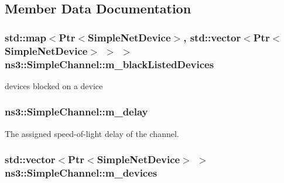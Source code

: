 \subsection{Member Data Documentation}
\subsubsection[{\texorpdfstring{m\+\_\+black\+Listed\+Devices}{m_blackListedDevices}}]{\setlength{\rightskip}{0pt plus 5cm}std\+::map$<${\bf Ptr}$<${\bf Simple\+Net\+Device}$>$, std\+::vector$<${\bf Ptr}$<${\bf Simple\+Net\+Device}$>$ $>$ $>$ ns3\+::\+Simple\+Channel\+::m\+\_\+black\+Listed\+Devices\hspace{0.3cm}{\ttfamily [private]}}\hypertarget{classns3_1_1SimpleChannel_aa50da357cc589209b13f7233d3b80898}{}\label{classns3_1_1SimpleChannel_aa50da357cc589209b13f7233d3b80898}


devices blocked on a device 

\subsubsection[{\texorpdfstring{m\+\_\+delay}{m_delay}}]{ ns3\+::\+Simple\+Channel\+::m\+\_\+delay\hspace{0.3cm}{\ttfamily [private]}}\hypertarget{classns3_1_1SimpleChannel_ada64a5f43714383448147d577bd8d619}{}\label{classns3_1_1SimpleChannel_ada64a5f43714383448147d577bd8d619}


The assigned speed-\/of-\/light delay of the channel. 

\subsubsection[{\texorpdfstring{m\+\_\+devices}{m_devices}}]{\setlength{\rightskip}{0pt plus 5cm}std\+::vector$<${\bf Ptr}$<${\bf Simple\+Net\+Device}$>$ $>$ ns3\+::\+Simple\+Channel\+::m\+\_\+devices\hspace{0.3cm}{\ttfamily [private]}}\hypertarget{classns3_1_1SimpleChannel_a70203624f45f2aae03d9ae6294f6c4ce}{}\label{classns3_1_1SimpleChannel_a70203624f45f2aae03d9ae6294f6c4ce}


